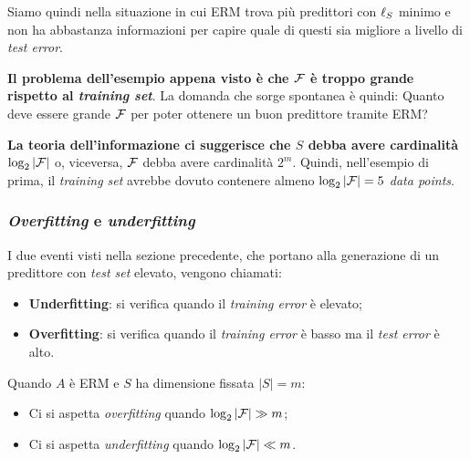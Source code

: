 Siamo quindi nella situazione in cui ERM trova più predittori con $\ell_S$ minimo e non
ha abbastanza informazioni per capire quale di questi sia migliore a livello di
\textit{test error}.

\textbf{Il problema dell'esempio appena visto è che $\mathcal{F}$ è troppo grande rispetto al
\textit{training set}}. La domanda che sorge spontanea è quindi: Quanto deve essere 
grande $\mathcal{F}$ per poter ottenere un buon predittore tramite ERM?

\textbf{La teoria dell'informazione ci suggerisce che $S$ debba avere cardinalità
$\log_2{|\mathcal{F}|}$} o, viceversa, $\mathcal{F}$ debba avere cardinalità $2^m$. Quindi, nell'esempio
di prima, il \textit{training set} avrebbe dovuto contenere almeno $\log_2{|\mathcal{F}|}=5$
\textit{data points}.

\subsubsection{\textit{Overfitting} e \textit{underfitting}}

I due eventi visti nella sezione precedente, che portano alla generazione di un predittore con 
\textit{test set} elevato, vengono chiamati:
\begin{itemize}
    \item \textbf{Underfitting}: si verifica quando il \textit{training error} 
        è elevato;
    \item \textbf{Overfitting}: si verifica quando il \textit{training error} 
    è basso ma il \textit{test error} è alto.
\end{itemize}

Quando $A$ è ERM e $S$ ha dimensione fissata $|S|=m$:
\begin{itemize}
    \item Ci si aspetta \textit{overfitting} quando $\log_2|\mathcal{F}| \gg m $;
    \item Ci si aspetta \textit{underfitting} quando $\log_2|\mathcal{F}| \ll m $.
\end{itemize}


